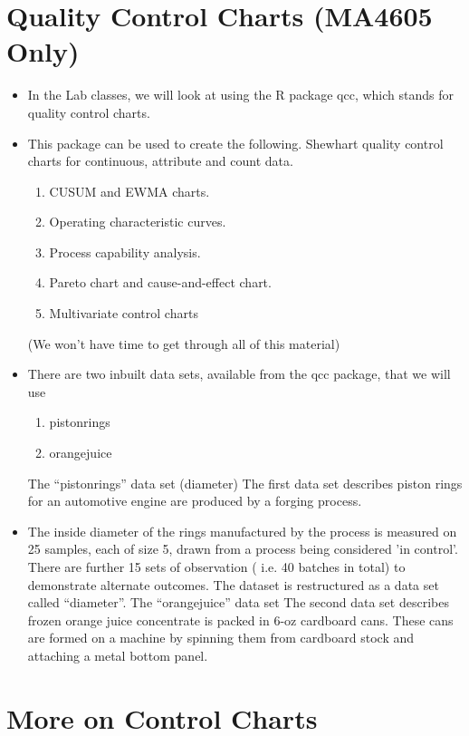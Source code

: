 \documentclass[MASTER-SPC.tex]{subfiles}
\begin{document}
\section{Quality Control Charts (MA4605 Only)}
\begin{itemize}
\item In the Lab classes, we will look at using the R package qcc, which stands for quality
control charts. 
\item This package can be used to create the following.
Shewhart quality control charts for continuous, attribute and count data.
\begin{enumerate}
\item CUSUM and EWMA charts.
\item Operating characteristic curves.
\item Process capability analysis.
\item Pareto chart and cause-and-effect chart.
\item Multivariate control charts
\end{enumerate}
(We won’t have time to get through all of this material)
\item There are two inbuilt data sets, available from the qcc package, that we will use
\begin{enumerate}
\item pistonrings
\item orangejuice
\end{enumerate}

The “pistonrings” data set (diameter)
The first data set describes piston rings for an automotive engine are produced by a
forging process.
\item The inside diameter of the rings manufactured by the process is measured on 25
samples, each of size 5, drawn from a process being considered 'in control'.
There are further 15 sets of observation ( i.e. 40 batches in total) to demonstrate
alternate outcomes.
The dataset is restructured as a data set called “diameter”.
The “orangejuice” data set
The second data set describes frozen orange juice concentrate is packed in 6-oz
cardboard cans. These cans are formed on a machine by spinning them from
cardboard stock and attaching a metal bottom panel.
\end{itemize} 
\section{More on Control Charts}
\end{document}
